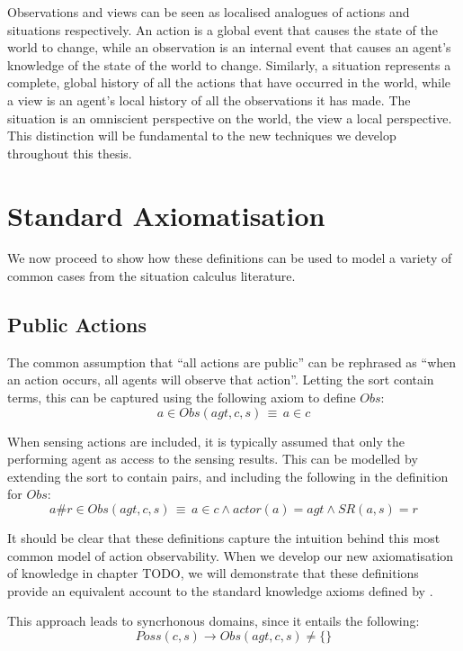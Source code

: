 Observations and views can be seen as localised analogues of actions
and situations respectively. An action is a global event that causes
the state of the world to change, while an observation is an internal
event that causes an agent's knowledge of the state of the world to
change. Similarly, a situation represents a complete, global history
of all the actions that have occurred in the world, while a view is
an agent's local history of all the observations it has made. The
situation is an omniscient perspective on the world, the view a local
perspective. This distinction will be fundamental to the new techniques
we develop throughout this thesis.


\section{Standard Axiomatisation}

We now proceed to show how these definitions can be used to model
a variety of common cases from the situation calculus literature. 


\subsection{Public Actions}

The common assumption that {}``all actions are public'' can be rephrased
as {}``when an action occurs, all agents will observe that action''.
Letting the sort contain terms,
this can be captured using the following axiom to define $Obs$:\[
a\in Obs(agt,c,s)\,\equiv\, a\in c\]


When sensing actions are included, it is typically assumed that only
the performing agent as access to the sensing results. This can be
modelled by extending the  sort to contain 
pairs, and including the following in the definition for $Obs$:\[
a\#r\in Obs(agt,c,s)\,\equiv\, a\in c\wedge actor(a)=agt\wedge SR(a,s)=r\]


It should be clear that these definitions capture the intuition behind
this most common model of action observability. When we develop our
new axiomatisation of knowledge in chapter TODO, we will demonstrate
that these definitions provide an equivalent account to the standard
knowledge axioms defined by \citet{scherl03sc_knowledge}.

This approach leads to syncrhonous domains, since it entails the following:\[
Poss(c,s)\rightarrow Obs(agt,c,s)\neq\{\}\]



